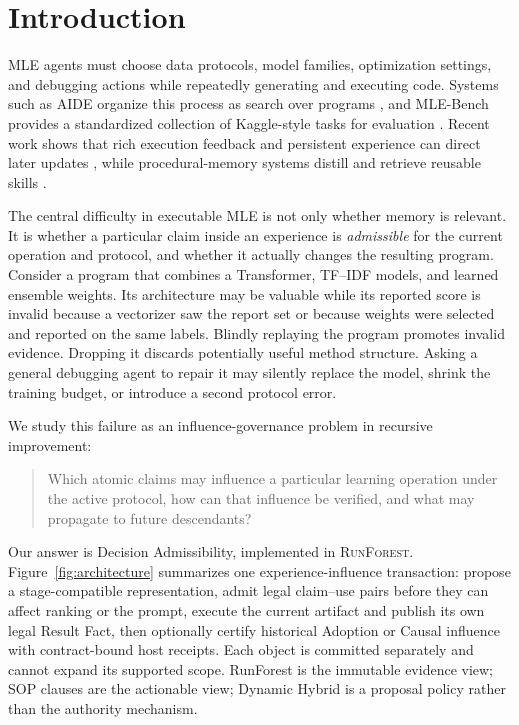 \documentclass{article}
\newcommand{\system}{\textsc{RunForest}}
\newcommand{\ours}{Decision Admissibility}
\begin{document}
\section{Introduction}

MLE agents must choose data protocols, model families, optimization settings,
and debugging actions while repeatedly generating and executing code.  Systems
such as AIDE organize this process as search over programs
\citep{jiang2025aide}, and MLE-Bench provides a standardized collection of
Kaggle-style tasks for evaluation \citep{chan2024mlebench}.  Recent work shows
that rich execution feedback and persistent experience can direct later
updates \citep{zhang2026gome}, while procedural-memory systems distill and
retrieve reusable skills \citep{xia2026skillrl,li2026skillgraph}.

The central difficulty in executable MLE is not only whether memory is
relevant.  It is whether a particular claim inside an experience is
\emph{admissible} for the current operation and protocol, and whether it
actually changes the resulting program.  Consider a
program that combines a Transformer, TF--IDF models, and learned ensemble
weights.  Its architecture may be valuable while its reported score is invalid
because a vectorizer saw the report set or because weights were selected and
reported on the same labels.  Blindly replaying the program promotes invalid
evidence.  Dropping it discards potentially useful method structure.  Asking a
general debugging agent to repair it may silently replace the model, shrink the
training budget, or introduce a second protocol error.

We study this failure as an influence-governance problem in recursive
improvement:

\begin{quote}
Which atomic claims may influence a particular learning operation under the
active protocol, how can that influence be verified, and what may propagate to
future descendants?
\end{quote}

Our answer is \ours{}, implemented in \system{}.  Figure~\ref{fig:architecture}
summarizes one experience-influence transaction: propose a stage-compatible
representation, admit legal claim--use pairs before they can affect ranking or
the prompt, execute the current artifact and publish its own legal Result Fact,
then optionally certify historical Adoption or Causal influence with
contract-bound host receipts.  Each object is committed separately and cannot
expand its supported scope.
RunForest is the immutable evidence view; SOP clauses are the actionable view;
Dynamic Hybrid is a proposal policy rather than the authority mechanism.
\end{document}
